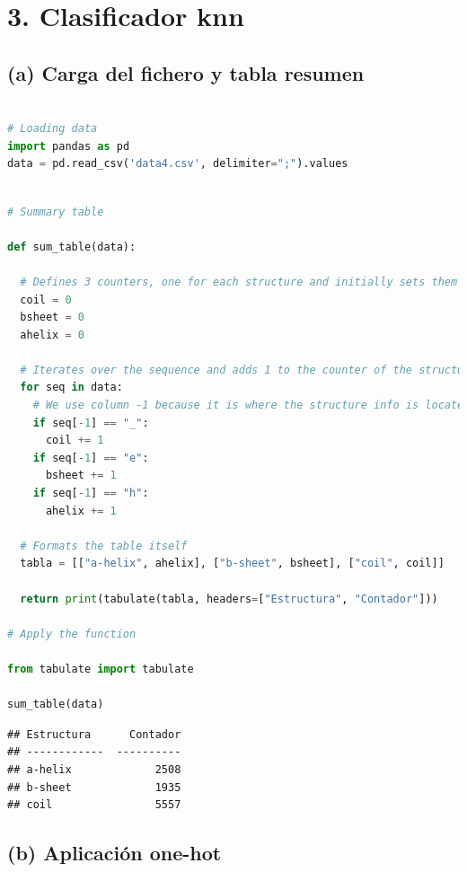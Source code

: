 \documentclass[
]{article}
\begin{document}
\hypertarget{clasificador-knn}{%
\section{3. Clasificador knn}\label{clasificador-knn}}

\hypertarget{a-carga-del-fichero-y-tabla-resumen}{%
\subsection{(a) Carga del fichero y tabla
resumen}\label{a-carga-del-fichero-y-tabla-resumen}}

\begin{lstlisting}[language=Python]

# Loading data
import pandas as pd
data = pd.read_csv('data4.csv', delimiter=";").values
\end{lstlisting}

\begin{lstlisting}[language=Python]

# Summary table

def sum_table(data):
  
  # Defines 3 counters, one for each structure and initially sets them to 0
  coil = 0
  bsheet = 0
  ahelix = 0

  # Iterates over the sequence and adds 1 to the counter of the structure encountered
  for seq in data:
    # We use column -1 because it is where the structure info is located
    if seq[-1] == "_":
      coil += 1
    if seq[-1] == "e":
      bsheet += 1
    if seq[-1] == "h":
      ahelix += 1

  # Formats the table itself
  tabla = [["a-helix", ahelix], ["b-sheet", bsheet], ["coil", coil]]
  
  return print(tabulate(tabla, headers=["Estructura", "Contador"]))

# Apply the function

from tabulate import tabulate

sum_table(data)
\end{lstlisting}

\begin{lstlisting}
## Estructura      Contador
## ------------  ----------
## a-helix             2508
## b-sheet             1935
## coil                5557
\end{lstlisting}

\hypertarget{b-aplicaciuxf3n-one-hot}{%
\subsection{(b) Aplicación one-hot}\label{b-aplicaciuxf3n-one-hot}}
\end{document}
